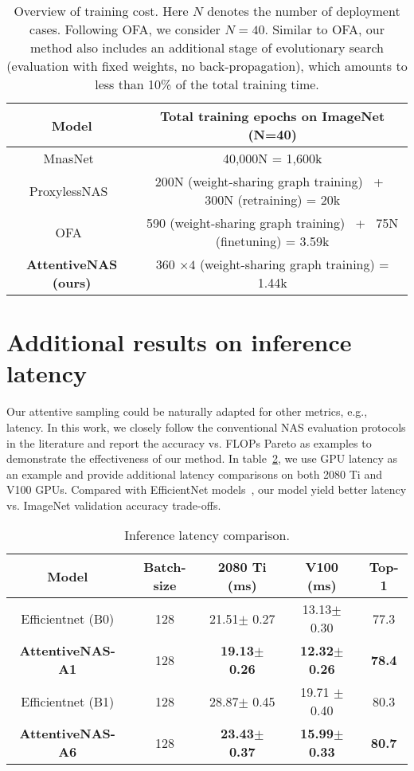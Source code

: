 \documentclass[final]{cvpr}
\theoremstyle{definition}
\begin{document}
\begin{table}[h]
    \centering
    \begin{tabular}{c|c}
    \hline
    Model   & Total training epochs on ImageNet (N=40) \\ \hline 
    MnasNet~\cite{tan2019mnasnet} & 40,000N  = 1,600k \\  
    ProxylessNAS~\cite{cai2018proxylessnas} & 200N (weight-sharing graph training) ~+~ 300N  (retraining) = 20k\\  
    OFA~\citep{cai2019once} & 590 (weight-sharing graph training) ~+~ 75N (finetuning)  = 3.59k \\  
    \bf AttentiveNAS (ours) & 360 $\times 4$ (weight-sharing graph training) = 1.44k  \\ \hline 
    \end{tabular}
    \caption{Overview of training cost. Here $N$ denotes the number of  deployment cases. Following OFA, we consider $N=40$. Similar to OFA, 
our method also includes an additional stage of evolutionary search 
(evaluation with fixed weights, no back-propagation), 
which amounts to  less than 10\% of the total training time.}
    \label{tab:cost} 
\end{table}


\section{Additional results on inference latency}
\label{app:inference_latency}
Our attentive sampling could be naturally adapted for other metrics, e.g., latency. 
In this work, we closely follow the conventional NAS evaluation protocols in the literature and report the accuracy vs. FLOPs Pareto as examples to demonstrate the effectiveness of our method. 
In table~\ref{tab:latency}, we use GPU latency as an example and provide additional latency comparisons on both 2080 Ti and V100 GPUs. 
Compared with EfficientNet models~\citep{tan2019efficientnet}, our model yield better latency vs. ImageNet 
validation accuracy trade-offs. 
\begin{table}[ht]
    \centering
    \begin{tabular}{c|c|ccc}
    \hline 
    Model & Batch-size &  2080 Ti (ms) & V100 (ms)  &  Top-1 \\ \hline 
    Efficientnet (B0) & 128 & 21.51{\scriptsize $\pm$ 0.27} &  13.13{\scriptsize $\pm$ 0.30} & 77.3 \\
    \bf AttentiveNAS-A1 & 128 & \bf{19.13{\scriptsize $\pm$ 0.26}} & \bf 12.32{\scriptsize $\pm$ 0.26} & \bf 78.4 \\  \hline 
    Efficientnet (B1) & 128 & 28.87{\scriptsize $\pm$ 0.45} & 19.71 {\scriptsize $\pm$ 0.40}  & 80.3 \\
    \bf AttentiveNAS-A6 & 128 & \bf{23.43{\scriptsize $\pm$ 0.37}}  & \bf 15.99{\scriptsize $\pm$ 0.33}   & \bf 80.7 \\  \hline 
    \end{tabular}
    \caption{Inference latency comparison.}
    \label{tab:latency}
\end{table}
\end{document}
